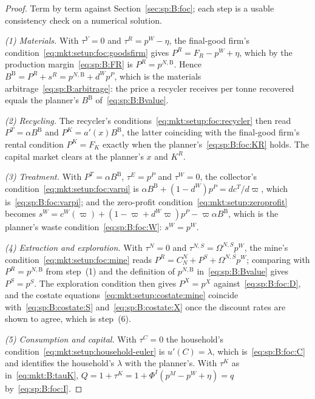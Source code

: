 \begin{proof}
Term by term against Section~\ref{sec:sp:B:foc}; each step is a usable consistency check on a
numerical solution.

\emph{(1) Materials.} With $\tau^Y=0$ and $\tau^R=p^W-\eta$, the final-good firm's
condition~\eqref{eq:mkt:setup:foc:goodsfirm} gives $P^R=F_R-p^W+\eta$, which by the production
margin~\eqref{eq:sp:B:FR} is $P^R=p^{N,\mathrm B}$. Hence $B^{\mathrm B}=P^R+s^R=p^{N,\mathrm B}+d^Wp^P$, which is the materials
arbitrage~\eqref{eq:sp:B:arbitrage}: the price a recycler receives per tonne recovered equals the
planner's $B^{\mathrm B}$ of~\eqref{eq:sp:B:Bvalue}.

\emph{(2) Recycling.} The recycler's conditions~\eqref{eq:mkt:setup:foc:recycler} then read
$P^T=\alpha B^{\mathrm B}$ and $P^K=a'\!\left(x\right)B^{\mathrm B}$, the latter coinciding with the final-good firm's rental
condition $P^K=F_K$ exactly when the planner's~\eqref{eq:sp:B:foc:KR} holds. The capital market clears
at the planner's $x$ and $K^R$.

\emph{(3) Treatment.} With $P^T=\alpha B^{\mathrm B}$, $\tau^E=p^P$ and $\tau^W=0$, the collector's
condition~\eqref{eq:mkt:setup:foc:varpi} is $\alpha B^{\mathrm B}+\left(1-d^W\right)p^P=dc^T/d\varpi$, which
is~\eqref{eq:sp:B:foc:varpi}; and the zero-profit condition~\eqref{eq:mkt:setup:zeroprofit} becomes
$s^W=c^W\!\left(\varpi\right)+\left(1-\varpi+d^W\varpi\right)p^P-\varpi\alpha B^{\mathrm B}$, which is the
planner's waste condition~\eqref{eq:sp:B:foc:W}: $s^W=p^W$.

\emph{(4) Extraction and exploration.} With $\tau^N=0$ and $\tau^{N,S}=\Omega^{N,S}p^W$, the mine's
condition~\eqref{eq:mkt:setup:foc:mine} reads $P^R=C^N_N+P^S+\Omega^{N,S}p^W$; comparing with
$P^R=p^{N,\mathrm B}$ from step~(1) and the definition of $p^{N,\mathrm B}$ in~\eqref{eq:sp:B:Bvalue} gives $P^S=p^S$. The
exploration condition then gives $P^X=p^X$ against~\eqref{eq:sp:B:foc:D}, and the costate
equations~\eqref{eq:mkt:setup:costate:mine} coincide with~\eqref{eq:sp:B:costate:S}
and~\eqref{eq:sp:B:costate:X} once the discount rates are shown to agree, which is step~(6).

\emph{(5) Consumption and capital.} With $\tau^C=0$ the household's
condition~\eqref{eq:mkt:setup:household-euler} is $u'(C)=\lambda$, which is~\eqref{eq:sp:B:foc:C} and
identifies the household's $\lambda$ with the planner's. With $\tau^K$ as in~\eqref{eq:mkt:B:tauK},
$Q=1+\tau^K=1+\Phi^I\left(p^M-p^W+\eta\right)=q$ by~\eqref{eq:sp:B:foc:I}.


\end{proof}
